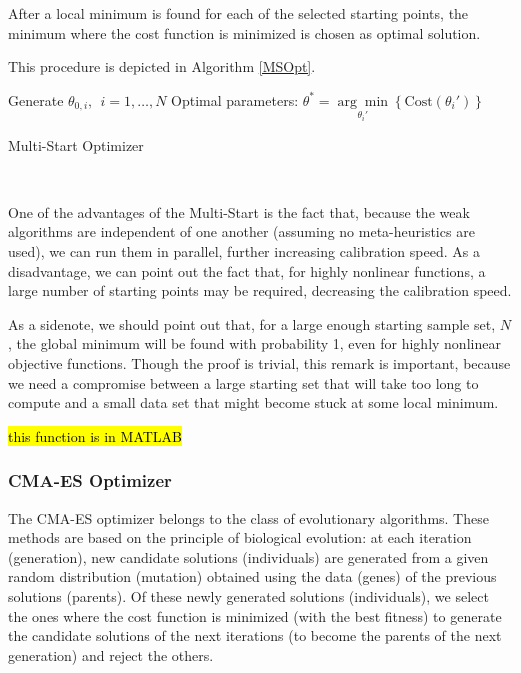 After a local minimum is found for each of the selected starting points, the minimum where the cost function is minimized is chosen as optimal solution.

This procedure is depicted in Algorithm \ref{MSOpt}.

\begin{algorithm}[H]\label{MSOpt}
\DontPrintSemicolon
Generate $\theta_{0,i},\ \ i=1,\ldots,N$
 Optimal parameters: $\theta^{*}=\underset{\theta_i'}{\arg\min}\left\{\mathrm{Cost}(\theta_i')\right\}$\;
 \caption{Multi-Start Optimizer}
\end{algorithm}
\ 

One of the advantages of the Multi-Start is the fact that, because the weak algorithms are independent of one another (assuming no meta-heuristics are used), we can run them in parallel, further increasing calibration speed.
As a disadvantage, we can point out the fact that, for highly nonlinear functions, a large number of starting points may be required, decreasing the calibration speed.

As a sidenote, we should point out that, for a large enough starting sample set, $N$, the global minimum will be found with probability 1, even for highly nonlinear objective functions. Though the proof is trivial, this remark is important, because we need a compromise between a large starting set that will take too long to compute and a small data set that might become stuck at some local minimum.


\hl{this function is in MATLAB}

\subsubsection{CMA-ES Optimizer}
The CMA-ES optimizer belongs to the class of evolutionary algorithms. These methods are based on the principle of biological evolution: at each iteration (generation), new candidate solutions (individuals) are generated from a given random distribution (mutation) obtained using the data (genes) of the previous solutions (parents). Of these newly generated solutions (individuals), we select the ones where the cost function is minimized (with the best fitness) to generate the candidate solutions of the next iterations (to become the parents of the next generation) and reject the others.



